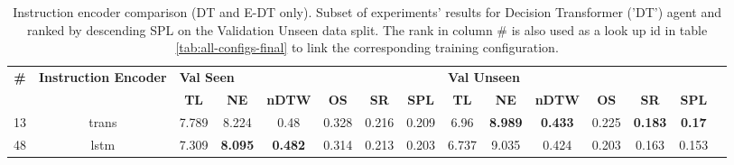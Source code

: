 \begin{table}
\centering
\caption{\label{tab:dt_instruction_encoding}Instruction encoder comparison (DT and E-DT only). Subset of experiments' results for Decision Transformer ('DT') agent and ranked by descending SPL on the Validation Unseen data split. The rank in column \# is also used as a look up id in table \ref{tab:all-configs-final} to link the corresponding training configuration.}
\begin{tabular}{@{\hskip3pt}c@{\hskip3pt}c@{\hskip3pt}c@{\hskip3pt}c@{\hskip3pt}c@{\hskip3pt}c@{\hskip3pt}c@{\hskip3pt}c@{\hskip3pt}c@{\hskip3pt}c@{\hskip3pt}c@{\hskip3pt}c@{\hskip3pt}c@{\hskip3pt}c@{\hskip3pt}c}
\toprule
\textbf{\#} & \textbf{Instruction Encoder} & \multicolumn{6}{l}{\textbf{Val Seen}} & \multicolumn{6}{l}{\textbf{Val Unseen}} \\
 \textbf{~} &                   \textbf{~} &       \textbf{TL} &     \textbf{NE} &   \textbf{nDTW} & \textbf{OS} & \textbf{SR} & \textbf{SPL} &         \textbf{TL} &     \textbf{NE} &   \textbf{nDTW} & \textbf{OS} &     \textbf{SR} &   \textbf{SPL} \\
\midrule
         13 &                        trans &             7.789 &           8.224 &            0.48 &       0.328 &       0.216 &        0.209 &                6.96 &  \textbf{8.989} &  \textbf{0.433} &       0.225 &  \textbf{0.183} &  \textbf{0.17} \\
         48 &                         lstm &             7.309 &  \textbf{8.095} &  \textbf{0.482} &       0.314 &       0.213 &        0.203 &               6.737 &           9.035 &           0.424 &       0.203 &           0.163 &          0.153 \\
\bottomrule
\end{tabular}
\end{table}
